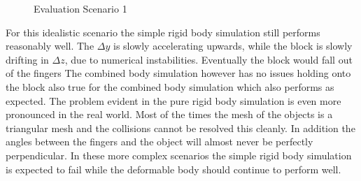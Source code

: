 \begin{figure}[htb]
	\centering
	\caption{Evaluation Scenario 1}
\end{figure}

For this idealistic scenario the simple rigid body simulation still performs reasonably well. The $\Delta y$ is slowly accelerating upwards, while the block is slowly drifting in $\Delta z$, due to numerical instabilities. Eventually the block would fall out of the fingers The combined body simulation however has no issues holding onto the block also true for the combined body simulation which also performs as expected. The problem evident in the pure rigid body simulation is even more pronounced in the real world. Most of the times the mesh of the objects is a triangular mesh and the collisions cannot be resolved this cleanly. In addition the angles between the fingers and the object will almost never be perfectly perpendicular. In these more complex scenarios the simple rigid body simulation is expected to fail while the deformable body should continue to perform well.

